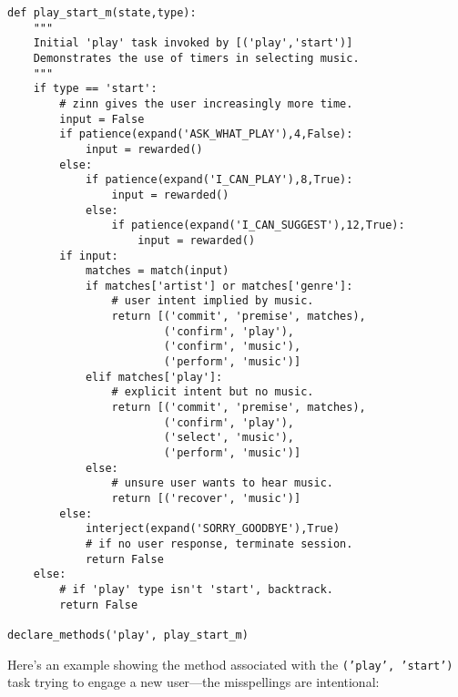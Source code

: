 \documentclass[letterpaper,11pt]{article}
\begin{document}
%
\begin{verbatim}
def play_start_m(state,type):
    """
    Initial 'play' task invoked by [('play','start')]
    Demonstrates the use of timers in selecting music.
    """
    if type == 'start':
        # zinn gives the user increasingly more time.
        input = False
        if patience(expand('ASK_WHAT_PLAY'),4,False):
            input = rewarded()
        else:
            if patience(expand('I_CAN_PLAY'),8,True):
                input = rewarded()
            else:
                if patience(expand('I_CAN_SUGGEST'),12,True):
                    input = rewarded()
        if input:
            matches = match(input)
            if matches['artist'] or matches['genre']:
                # user intent implied by music.
                return [('commit', 'premise', matches),
                        ('confirm', 'play'),
                        ('confirm', 'music'),
                        ('perform', 'music')]
            elif matches['play']:
                # explicit intent but no music.
                return [('commit', 'premise', matches),
                        ('confirm', 'play'),
                        ('select', 'music'),
                        ('perform', 'music')]
            else:
                # unsure user wants to hear music.
                return [('recover', 'music')]
        else:
            interject(expand('SORRY_GOODBYE'),True)
            # if no user response, terminate session.
            return False
    else:
        # if 'play' type isn't 'start', backtrack.
        return False

declare_methods('play', play_start_m)
\end{verbatim}
%
Here's an example showing the method associated with the {\tt{('play', 'start')}} task trying to engage a new user---the misspellings are intentional:
\end{document}
